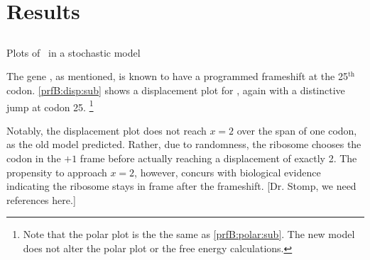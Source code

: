 \documentclass[12pt, draft]{article}
\numberwithin{equation}{section}
\begin{document}
\section{Results}
\subsection{\prfB}

\begin{cfigure}
  \caption{Plots of \prfB\ in a stochastic model}
  \label{prfB:stochplots}
\end{cfigure}

The gene \prfB, as mentioned, is known
to have a programmed frameshift at the 25$^{\textrm{th}}$ codon.
\autoref{prfB:disp:sub} shows a displacement plot for
\prfB, again with a distinctive jump at codon 25.
\footnote{Note that the polar plot is the the same as \autoref{prfB:polar:sub}.
The new model does not alter the polar plot or the free energy calculations.}

Notably, the displacement plot does not reach $x=2$ over the span of
one codon, as the old model predicted.  Rather, due to randomness, the
ribosome chooses the codon in the $+1$ frame before actually reaching
a displacement of exactly 2.  The propensity to approach $x=2$,
however, concurs with biological evidence indicating the ribosome
stays in frame after the frameshift.  [Dr. Stomp, we need references
  here.]
  
\end{document}
